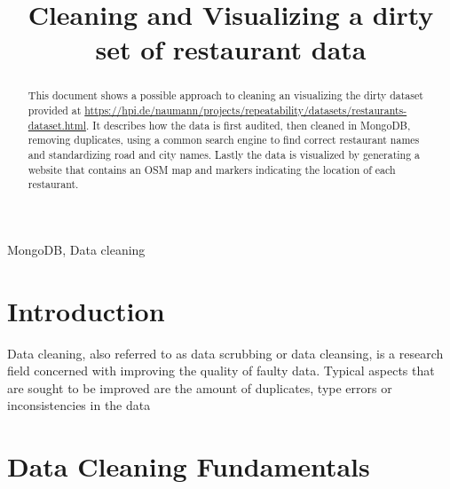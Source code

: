 \documentclass[conference]{IEEEtran}
\begin{document}
\title{Cleaning and Visualizing a dirty set of restaurant data}


\author{
}

\maketitle

\begin{abstract}
This document shows a possible approach to cleaning an visualizing the dirty dataset provided at \url{https://hpi.de/naumann/projects/repeatability/datasets/restaurants-dataset.html}. It describes how the data is first audited, then cleaned in MongoDB, removing duplicates, using a common search engine to find correct restaurant names and standardizing road and city names. Lastly the data is visualized by generating a website that contains an OSM map and markers indicating the location of each restaurant.
\end{abstract}

\begin{IEEEkeywords}
MongoDB, Data cleaning
\end{IEEEkeywords}

\section{Introduction}
Data cleaning, also referred to as data scrubbing or data cleansing, is a research field concerned with improving the quality of faulty data. Typical aspects that are sought to be improved are the amount of duplicates, type errors or inconsistencies in the data


\section{Data Cleaning Fundamentals}
\end{document}
